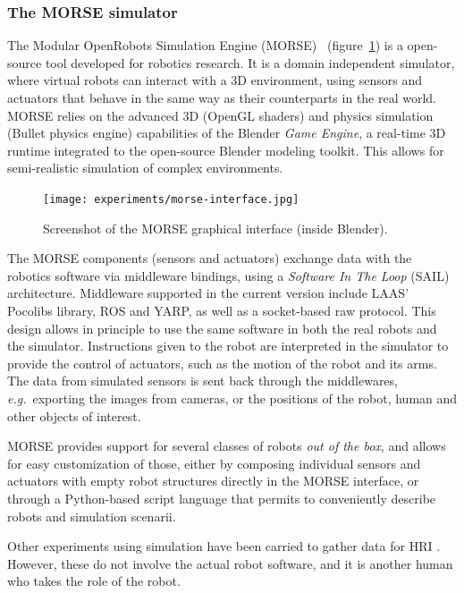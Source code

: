 \subsubsection{The MORSE simulator}

The Modular OpenRobots Simulation Engine (MORSE)~\cite{Echeverria2011}
(figure~\ref{fig|morse-gui}) is a open-source tool developed for robotics
research. It is a domain independent simulator, where virtual robots can
interact with a 3D environment, using sensors and actuators that behave in the
same way as their counterparts in the real world.  MORSE relies on the advanced
3D (OpenGL shaders) and physics simulation ({\sc Bullet} physics engine)
capabilities of the Blender \emph{Game Engine}, a real-time 3D runtime
integrated to the open-source Blender modeling toolkit.  This allows for
semi-realistic simulation of complex environments.

\begin{figure}[t]
      \centering
      \texttt{[image: experiments/morse-interface.jpg]}
      \caption{Screenshot of the MORSE graphical interface (inside Blender).}
      \label{fig|morse-gui}
\end{figure}


The MORSE components (sensors and actuators) exchange data with the robotics
software via middleware bindings, using a \emph{Software In The Loop} (SAIL)
architecture. Middleware supported in the current version include LAAS'
Pocolibs library, ROS and YARP, as well as a socket-based raw protocol. This
design allows in principle to use the same software in both the real robots and
the simulator. Instructions given to the robot are interpreted in the simulator
to provide the control of actuators, such as the motion of the robot and its
arms.  The data from simulated sensors is sent back through the middlewares,
{\it e.g.}~exporting the images from cameras, or the positions of the robot,
human and other objects of interest.

MORSE provides support for several classes of robots \textit{out of the box}, and
allows for easy customization of those, either by composing individual sensors
and actuators with empty robot structures directly in the MORSE interface, or
through a Python-based script language that permits to conveniently describe
robots and simulation scenarii.

Other experiments using simulation have been carried to gather data for HRI
\cite{Chernova2011}. However, these do not involve the actual robot software,
and it is another human who takes the role of the robot.

